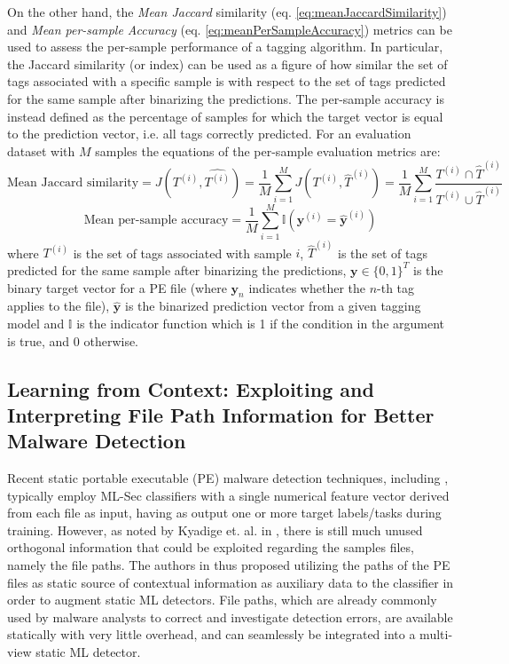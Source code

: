 \documentclass[pdfa%
,cucitura%
]{toptesi}
\begin{document}
On the other hand, the \textit{Mean Jaccard} similarity (eq. \ref{eq:meanJaccardSimilarity}) and \textit{Mean per-sample Accuracy} (eq. \ref{eq:meanPerSampleAccuracy}) metrics can be used to assess the per-sample performance of a tagging algorithm. In particular, the Jaccard similarity (or index) can be used as a figure of how similar the set of tags associated with a specific sample is with respect to the set of tags predicted for the same sample after binarizing the predictions. The per-sample accuracy is instead defined as the percentage of samples for which the target vector is equal to the prediction vector, i.e. all tags correctly predicted. For an evaluation dataset with $M$ samples the equations of the per-sample evaluation metrics are:
\begin{equation}\label{eq:meanJaccardSimilarity}
	\textrm{Mean Jaccard similarity} = J(T^{(i)}, \hat{T^{(i)}}) = \frac{1}{M} \sum_{i=1}^{M} J(T^{(i)}, \hat{T}^{(i)}) = \frac{1}{M} \sum_{i=1}^{M} \frac{T^{(i)} \cap \hat{T}^{(i)}} {T^{(i)} \cup \hat{T}^{(i)}}
\end{equation}
\begin{equation}\label{eq:meanPerSampleAccuracy}
	\textrm{Mean per-sample accuracy} = \frac{1}{M} \sum_{i=1}^{M} \mathbb{I}(\textbf{y}^{(i)} = \hat{\textbf{y}}^{(i)})
\end{equation}
where $T^{(i)}$ is the set of tags associated with sample $i$, $\hat{T}^{(i)}$ is the set of tags predicted for the same sample after binarizing the predictions, $\textbf{y} \in \{0, 1\}^T$ is the binary target vector for a PE file (where $\textbf{y}_n$ indicates whether the $n$-th tag applies to the file), $\hat{\textbf{y}}$ is the binarized prediction vector from a given tagging model and $\mathbb{I}$ is the indicator function which is 1 if the condition in the argument is true, and 0 otherwise.

\subsection{Learning from Context: Exploiting and Interpreting File Path Information for Better Malware Detection}
Recent static portable executable (PE) malware detection techniques, including \cite{ruddALOHA}, typically employ ML-Sec classifiers with a single numerical feature vector derived from each file as input, having as output one or more target labels/tasks during training. However, as noted by Kyadige et. al. in \cite{KyadigeLFCEIFPIBMD}, there is still much unused orthogonal information that could be exploited regarding the samples files, namely the file paths. The authors in \cite{KyadigeLFCEIFPIBMD} thus proposed utilizing the paths of the PE files as static source of contextual information as auxiliary data to the classifier in order to augment static ML detectors. File paths, which are already commonly used by malware analysts to correct and investigate detection errors, are available statically with very little overhead, and can seamlessly be integrated into a multi-view static ML detector.
\end{document}
